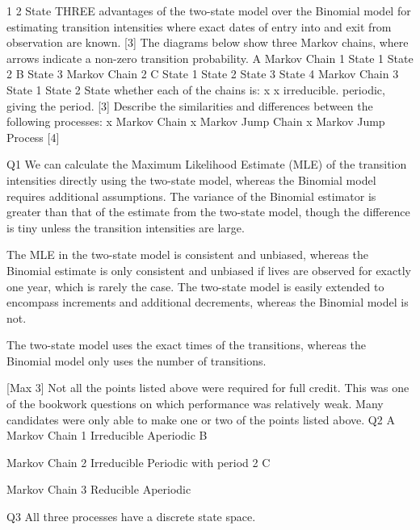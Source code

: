 \documentclass[a4paper,12pt]{article}
\begin{document}
1
2
State THREE advantages of the two-state model over the Binomial model for
estimating transition intensities where exact dates of entry into and exit from
observation are known.
[3]
The diagrams below show three Markov chains, where arrows indicate a non-zero
transition probability.
A
Markov Chain 1
State 1
State 2
B
State 3
Markov Chain 2
C
State 1 State 2
State 3 State 4
Markov Chain 3
State 1
State 2
State whether each of the chains is:
x
x
irreducible.
periodic, giving the period.
[3]
Describe the similarities and differences between the following processes:
x Markov Chain
x Markov Jump Chain
x Markov Jump Process
[4]

\newpage
Q1
We can calculate the Maximum Likelihood Estimate (MLE) of the transition intensities
directly using the two-state model, 
whereas the Binomial model requires additional assumptions. 
The variance of the Binomial estimator is greater than that of the estimate from the two-state
model, though the difference is tiny unless the transition intensities are large.

The MLE in the two-state model is consistent and unbiased, 
whereas the Binomial estimate is only consistent and unbiased if lives are observed for
exactly one year, which is rarely the case. 
The two-state model is easily extended to encompass increments and additional decrements,
whereas the Binomial model is not.

The two-state model uses the exact times of the transitions, whereas the Binomial model only
uses the number of transitions.

[Max 3]
Not all the points listed above were required for full credit. This was one of the
bookwork questions on which performance was relatively weak. Many
candidates were only able to make one or two of the points listed above.
\newpage
Q2
A
Markov Chain 1
Irreducible
Aperiodic
B


Markov Chain 2
Irreducible
Periodic with period 2
C


Markov Chain 3
Reducible
Aperiodic


\newpage
Q3
All three processes have a discrete state space.
\end{document}
